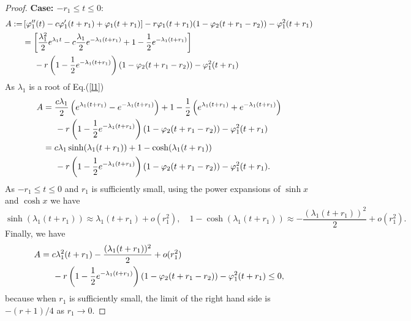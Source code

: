 \documentclass[12pt,letterpaper]{amsart}
\theoremstyle{definition}
\theoremstyle{remark}
\numberwithin{equation}{section}
\begin{document}
\begin{proof}
\medskip\noindent
{\bf Case: $-r_1 \le t\le 0$}:
\begin{align*}
A:=&  \left[
\varphi_{1}^{\prime\prime}(t)-c\varphi_{1}^{\prime}(t+r_1)+\varphi
_{1}(t+r_1)\right]  -r\varphi_{1}(t+r_1)(1-\varphi_{2}(t+r_1-r_2))-\varphi_{1}^{2}(t+r_1)\\
&  =\left[  \frac{\lambda_{1}^{2}}{2}e^{\lambda_{1}t}-c\frac{\lambda_{1}} 
{2}e^{-\lambda_{1}(t+r_1)}+1-\frac{1}{2}e^{-\lambda_{1}(t+r_1)}\right]  \\
& \hspace{.5cm} -r\left( 1-\frac{1}{2}e^{-\lambda_{1}(t+r_1)}\right) \left(  1-\varphi_{2}(t+r_1-r_2)\right)  -\varphi_{1}^{2}(t+r_1)\\
\end{align*}
As $\lambda_1$ is a root of Eq.(\ref{l1})
\begin{align*}
A&= \frac{c\lambda_1}{2}\left(e^{\lambda_1(t+r_1)}-e^{-\lambda_1(t+r_1)} \right) + 1-\frac{1}{2}\left( e^{\lambda_1(t+r_1)}+e^{-\lambda_1(t+r_1)} \right) \\
& \hspace{.5cm} -r\left( 1-\frac{1}{2}e^{-\lambda_{1}(t+r_1)}\right) \left(  1-\varphi_{2}(t+r_1-r_2)\right)  -\varphi_{1}^{2}(t+r_1)\\
&  =c\lambda_1 \sinh (\lambda_1(t+r_1))+1-\cosh (\lambda_1(t+r_1)) \\
& \hspace{.5cm} -r\left( 1-\frac{1}{2}e^{-\lambda_{1}(t+r_1)}\right) \left(  1-\varphi_{2}(t+r_1-r_2)\right)  -\varphi_{1}^{2}(t+r_1).
\end{align*}
As $-r_1\le t\le 0$ and $r_1$ is sufficiently small, using the power expansions of $\sinh x$ and $\cosh x$ we have
$$
\sinh (\lambda_1(t+r_1)) \approx \lambda_1(t+r_1 )+o(r^2_1), \quad 1-\cosh (\lambda_1(t+r_1))\approx - \frac{(\lambda_1(t+r_1))^2}{2}+o(r^2_1).
$$
Finally, we have 
\begin{align*}
A&  = c\lambda_1^2(t+r_1) - \frac{(\lambda_1(t+r_1))^2}{2}+o(r^2_1) \\
&\hspace{.5cm }  -r\left( 1-\frac{1}{2}e^{-\lambda_{1}(t+r_1)}\right) \left(  1-\varphi_{2}(t+r_1-r_2)\right)  -\varphi_{1}^{2}(t+r_1)\le 0,
\end{align*}
because when $r_1$ is sufficiently small, the limit of the right hand side is $-(r+1)/4$ as $r_1\to 0$.


\end{proof}
\end{document}
